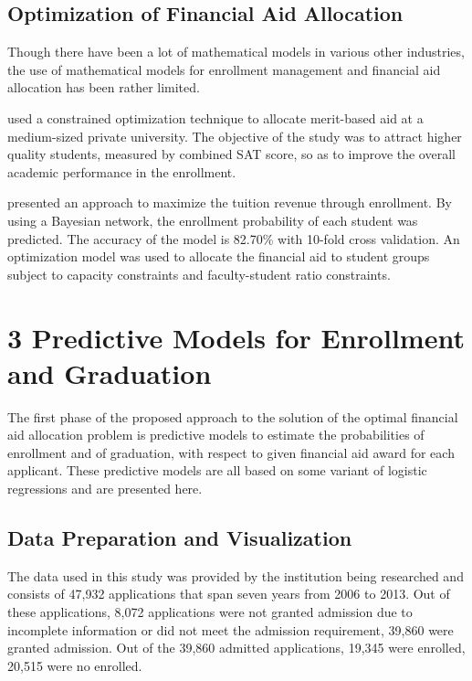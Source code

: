 \documentclass[12pt,english]{report}
\begin{document}
\section{Optimization of Financial Aid Allocation}
Though there have been a lot of mathematical models in various other industries, the use of mathematical models for enrollment management and financial aid allocation has been rather limited. 

\citet{optimization1} used a constrained optimization technique to allocate merit-based aid at a medium-sized private university. The objective of the study was to attract higher quality students, measured by combined SAT score, so as to improve the overall academic performance in the enrollment. %

\citet{optimization_bayesian} presented an approach to maximize the tuition revenue through enrollment. By using a Bayesian network, the enrollment probability of each student was predicted. The accuracy of the model is 82.70\% with 10-fold cross validation. An optimization model was used to allocate the financial aid to student groups subject to capacity constraints and faculty-student ratio constraints. %


\chapter{3 Predictive Models for Enrollment and Graduation}
The first phase of the proposed approach to the solution of the optimal financial aid allocation problem is predictive models to estimate the probabilities of enrollment and of graduation, with respect to given financial aid award for each applicant. These predictive models are all based on some variant of logistic regressions and are presented here.

   
\section{Data Preparation and Visualization}
The data used in this study was provided by the institution being researched and consists of 47,932 applications that span seven years from 2006 to 2013. Out of these applications, 8,072 applications were not granted admission due to incomplete information or did not meet the admission requirement, 39,860 were granted admission. Out of the 39,860 admitted applications, 19,345 were enrolled, 20,515 were no enrolled. 
\end{document}
